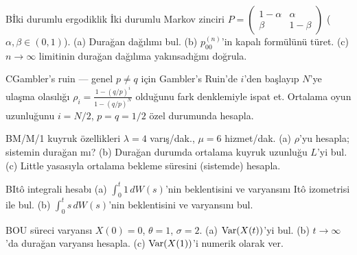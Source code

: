 \begin{alistirma}[Al.10.4]{B}{İki durumlu ergodiklik}
İki durumlu Markov zinciri $P=\begin{pmatrix}1-\alpha&\alpha\\\beta&1-\beta\end{pmatrix}$ ($\alpha,\beta\in(0,1)$). (a) Durağan dağılımı bul. (b) $p_{00}^{(n)}$'in kapalı formülünü türet. (c) $n\to\infty$ limitinin durağan dağılıma yakınsadığını doğrula.
\end{alistirma}

\begin{alistirma}[Al.10.5]{C}{Gambler's ruin --- genel}
$p\neq q$ için Gambler's Ruin'de $i$'den başlayıp $N$'ye ulaşma olasılığı $\rho_i=\frac{1-(q/p)^i}{1-(q/p)^N}$ olduğunu fark denklemiyle ispat et. Ortalama oyun uzunluğunu $i=N/2$, $p=q=1/2$ özel durumunda hesapla.
\end{alistirma}

\begin{alistirma}[Al.10.6]{B}{M/M/1 kuyruk özellikleri}
$\lambda=4$ varış/dak., $\mu=6$ hizmet/dak. (a) $\rho$'yu hesapla; sistemin durağan mı? (b) Durağan durumda ortalama kuyruk uzunluğu $L$'yi bul. (c) Little yasasıyla ortalama bekleme süresini (sistemde) hesapla.
\end{alistirma}

\begin{alistirma}[Al.10.7]{B}{Itô integrali hesabı}
(a) $\int_0^t 1\,dW(s)$'nin beklentisini ve varyansını Itô izometrisi ile bul. (b) $\int_0^t s\,dW(s)$'nin beklentisini ve varyansını bul.
\end{alistirma}

\begin{alistirma}[Al.10.9]{B}{OU süreci varyansı}
$X(0)=0$, $\theta=1$, $\sigma=2$. (a) $\operatorname{Var}(X(t))$'yi bul. (b) $t\to\infty$'da durağan varyansı hesapla. (c) $\operatorname{Var}(X(1))$'i numerik olarak ver.
\end{alistirma}

